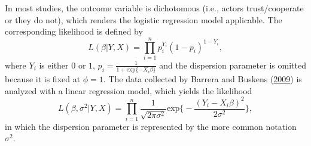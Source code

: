 \documentclass[
  11pt,
]{article}
\begin{document}
In most studies, the outcome variable is dichotomous (i.e., actors trust/cooperate or they do not), which renders the logistic regression model applicable.
The corresponding likelihood is defined by
\[
L(\beta | Y, X) = \prod^n_{i=1} p_i^{Y_i} (1 - p_i)^{1 - Y_i},
\]
where \(Y_i\) is either \(0\) or \(1\), \(p_i = \frac{1}{1 + \text{exp}\{-X_i\beta\}}\) and the dispersion parameter is omitted because it is fixed at \(\phi = 1\).
The data collected by Barrera and Buskens (\protect\hyperlink{ref-barrera_buskens_third_2009}{2009}) is analyzed with a linear regression model, which yields the likelihood
\[
L(\beta, \sigma^2 | Y, X) = \prod^n_{i=1} \frac{1}{\sqrt{2\pi\sigma^2}} \text{exp}\Bigg\{-\frac{(Y_i - X_i\beta)^2}{2\sigma^2}\Bigg\},
\]
in which the dispersion parameter is represented by the more common notation \(\sigma^2\).
\end{document}
